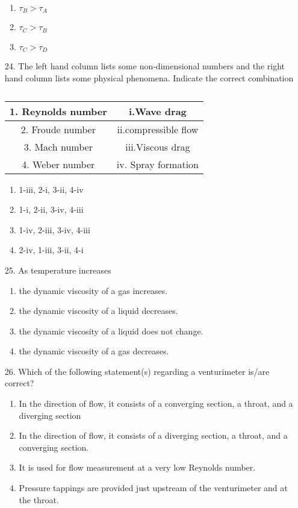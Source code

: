 \documentclass[journal]{IEEEtran}
\begin{document}
\begin{enumerate}
\begin{enumerate}[label = (\Alph*)]
        \item $\tau_B > \tau_A$
        \item $\tau_C > \tau_B$
        \item $\tau_C > \tau_D$
    \end{enumerate}
    \item[24.] The left hand column lists some non-dimensional numbers and the right hand column lists some physical phenomena. Indicate the correct combination 
    \begin{table}
        \centering
        \begin{tabular}{|c|c|}
            \hline
           1. Reynolds number& i.Wave drag \\ \hline
            2. Froude number& ii.compressible flow \\ \hline
            3. Mach number & iii.Viscous drag \\ \hline
            4. Weber number & iv. Spray formation \\ \hline
        \end{tabular} %
        \caption{}
    \end{table}
    \begin{enumerate}[label = (\Alph*)]
        \item 1-iii, 2-i, 3-ii, 4-iv
        \item 1-i, 2-ii, 3-iv, 4-iii
        \item 1-iv, 2-iii, 3-iv, 4-iii
        \item 2-iv, 1-iii, 3-ii, 4-i
    \end{enumerate}
    \item[25.] As temperature increases
    \begin{enumerate}[label = (\Alph*)]
        \item the dynamic viscosity of a gas increases. 
        \item the dynamic viscosity of a liquid decreases.
        \item the dynamic viscosity of a liquid does not change.
        \item the dynamic viscosity of a gas decreases. 
    \end{enumerate}
    \item[26.] Which of the following statement(s) regarding a venturimeter is/are correct? 
    \begin{enumerate}[label = (\Alph*)]
        \item In the direction of flow, it consists of a converging section, a throat, and a
        diverging section
        \item In the direction of flow, it consists of a diverging section, a throat, and a
        converging section.
        \item It is used for flow measurement at a very low Reynolds number.
        \item Pressure tappings are provided just upstream of the venturimeter and at the throat.
    \end{enumerate}
\end{enumerate}
\end{document}
